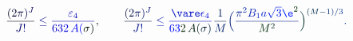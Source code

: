 \documentclass[12pt]{article}
\begin{document}
\makeatletter
\renewcommand*{\@textcolor}[3]{%
  \protect\leavevmode
  \begingroup
    \color#1{#2}#3%
  \endgroup
}
\makeatother
\begin{displaymath}
\mathcolor[RGB]{0,0,15}{\frac { \mathcolor[RGB]{0,0,30}{(} \mathcolor[RGB]{0,0,45}{2} \mathcolor[RGB]{0,0,60}{\pi} \mathcolor[RGB]{0,0,75}{)} ^ { \mathcolor[RGB]{0,0,90}{J} } } { \mathcolor[RGB]{0,0,105}{J} \mathcolor[RGB]{0,0,120}{!} } } \mathcolor[RGB]{0,0,135}{\leq} \mathcolor[RGB]{0,0,150}{\frac { \mathcolor[RGB]{0,0,165}{\varepsilon} _ { \mathcolor[RGB]{0,0,180}{4} } } { \mathcolor[RGB]{0,0,195}{6} \mathcolor[RGB]{0,0,210}{3} \mathcolor[RGB]{0,0,225}{2} \, \mathcolor[RGB]{0,0,240}{A} \mathcolor[RGB]{0,0,255}{(} \mathcolor[RGB]{0,15,0}{\sigma} \mathcolor[RGB]{0,15,15}{)} } } \mathcolor[RGB]{0,15,30}{,} \qquad \mathcolor[RGB]{0,15,45}{\frac { \mathcolor[RGB]{0,15,60}{(} \mathcolor[RGB]{0,15,75}{2} \mathcolor[RGB]{0,15,90}{\pi} \mathcolor[RGB]{0,15,105}{)} ^ { \mathcolor[RGB]{0,15,120}{J} } } { \mathcolor[RGB]{0,15,135}{J} \mathcolor[RGB]{0,15,150}{!} } } \mathcolor[RGB]{0,15,165}{\leq} \mathcolor[RGB]{0,15,180}{\frac { \mathcolor[RGB]{0,15,195}{\vare} \mathcolor[RGB]{0,15,210}{\epsilon} _ { \mathcolor[RGB]{0,15,225}{4} } } { \mathcolor[RGB]{0,15,240}{6} \mathcolor[RGB]{0,15,255}{3} \mathcolor[RGB]{0,30,0}{2} \, \mathcolor[RGB]{0,30,15}{A} \mathcolor[RGB]{0,30,30}{(} \mathcolor[RGB]{0,30,45}{\sigma} \mathcolor[RGB]{0,30,60}{)} } } \mathcolor[RGB]{0,30,75}{\frac { \mathcolor[RGB]{0,30,90}{1} } { \mathcolor[RGB]{0,30,105}{M} } } \mathcolor[RGB]{0,30,120}{\Big(} \mathcolor[RGB]{0,30,135}{\frac { \mathcolor[RGB]{0,30,150}{\pi} ^ { \mathcolor[RGB]{0,30,165}{2} } \mathcolor[RGB]{0,30,180}{B} _ { \mathcolor[RGB]{0,30,195}{1} } \mathcolor[RGB]{0,30,210}{a} \mathcolor[RGB]{0,30,225}{\sqrt { \mathcolor[RGB]{0,30,240}{3} } } \mathcolor[RGB]{0,30,255}{\e} ^ { \mathcolor[RGB]{0,45,0}{2} } } { \mathcolor[RGB]{0,45,15}{M} ^ { \mathcolor[RGB]{0,45,30}{2} } } } \mathcolor[RGB]{0,45,45}{\Big)} ^ { \mathcolor[RGB]{0,45,60}{(} \mathcolor[RGB]{0,45,75}{M} \mathcolor[RGB]{0,45,90}{-} \mathcolor[RGB]{0,45,105}{1} \mathcolor[RGB]{0,45,120}{)} \mathcolor[RGB]{0,45,135}{/} \mathcolor[RGB]{0,45,150}{3} } \mathcolor[RGB]{0,45,165}{.}
\end{displaymath}
\end{document}

